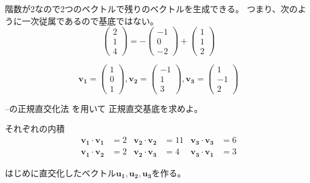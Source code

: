 \documentclass[12pt,b5paper]{ltjsarticle}
\begin{document}
階数が2なので2つのベクトルで残りのベクトルを生成できる。
つまり、次のように一次従属であるので基底ではない。
\begin{equation}
 \begin{pmatrix}2\\1\\4\end{pmatrix}=
 -\begin{pmatrix}-1\\0\\-2\end{pmatrix}
 +\begin{pmatrix}1\\1\\2\end{pmatrix}
\end{equation}



\hrulefill

\begin{equation}
 \bm{v_1} = \begin{pmatrix}1\\0\\1\end{pmatrix},
 \bm{v_2} = \begin{pmatrix}-1\\1\\3\end{pmatrix},
 \bm{v_3} = \begin{pmatrix}1\\-1\\2\end{pmatrix}
\end{equation}

–の正規直交化法
を用いて
正規直交基底を求めよ。

\dotfill

それぞれの内積
\begin{align}
 \bm{v_1}\cdot\bm{v_1} &= 2 &
 \bm{v_2}\cdot\bm{v_2} &= 11 &
 \bm{v_3}\cdot\bm{v_3} &= 6\\
 \bm{v_1}\cdot\bm{v_2} &= 2 &
 \bm{v_2}\cdot\bm{v_3} &= 4 &
 \bm{v_3}\cdot\bm{v_1} &= 3
\end{align}

はじめに直交化したベクトル$\bm{u_1},\bm{u_2},\bm{u_3}$を作る。
\end{document}
